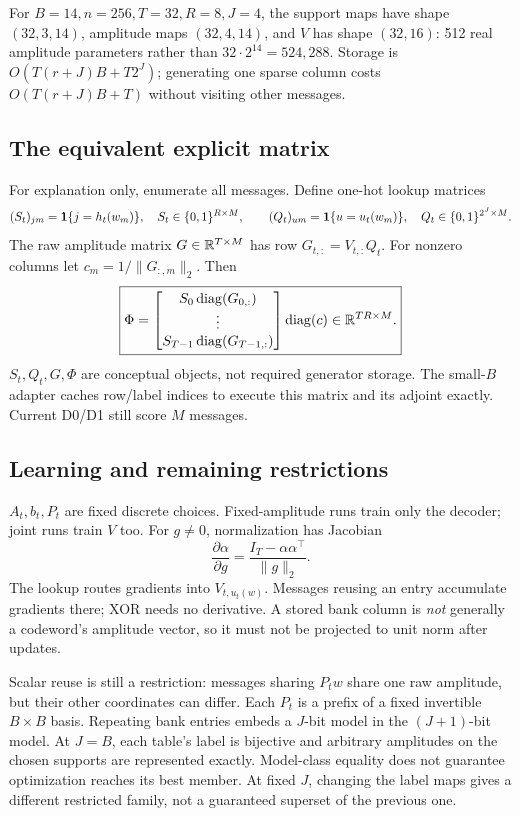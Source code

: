 \documentclass[11pt]{article}
\begin{document}
For $B=14,n=256,T=32,R=8,J=4$, the support maps have shape $(32,3,14)$, amplitude maps $(32,4,14)$,
and $V$ has shape $(32,16)$: 512 real amplitude parameters rather than $32\cdot2^{14}=524{,}288$.
Storage is $O(T(r+J)B+T2^J)$; generating one sparse column costs $O(T(r+J)B+T)$ without visiting other messages.

\subsection{The equivalent explicit matrix}

For explanation only, enumerate all messages. Define one-hot lookup matrices
\[
 (S_t)_{jm}=\mathbf{1}\{j=h_t(w_m)\},\quad S_t\in\{0,1\}^{R\times M},\qquad
 (Q_t)_{um}=\mathbf{1}\{u=u_t(w_m)\},\quad Q_t\in\{0,1\}^{2^J\times M}.
\]
The raw amplitude matrix $G\in\mathbb{R}^{T\times M}$ has row $G_{t,:}=V_{t,:}Q_t$.
For nonzero columns let $c_m=1/\|G_{:,m}\|_2$. Then
\[
 \boxed{\Phi=
 \begin{bmatrix}S_0\operatorname{diag}(G_{0,:})\\ \vdots\\ S_{T-1}\operatorname{diag}(G_{T-1,:})\end{bmatrix}
 \operatorname{diag}(c)\in\mathbb{R}^{TR\times M}.}
\]
$S_t,Q_t,G,\Phi$ are conceptual objects, not required generator storage. The small-$B$ adapter caches row/label
indices to execute this matrix and its adjoint exactly. Current D0/D1 still score $M$ messages.

\subsection{Learning and remaining restrictions}

$A_t,b_t,P_t$ are fixed discrete choices. Fixed-amplitude runs train only the decoder; joint runs train $V$ too.
For $g\ne0$, normalization has Jacobian
\[
 \frac{\partial\alpha}{\partial g}=\frac{I_T-\alpha\alpha^\top}{\|g\|_2}.
\]
The lookup routes gradients into $V_{t,u_t(w)}$. Messages reusing an entry accumulate gradients there; XOR needs
no derivative. A stored bank column is \emph{not} generally a codeword's amplitude vector, so it must not be
projected to unit norm after updates.

Scalar reuse is still a restriction: messages sharing $P_tw$ share one raw amplitude, but their other coordinates
can differ. Each $P_t$ is a prefix of a fixed invertible $B\times B$ basis. Repeating bank entries embeds a $J$-bit
model in the $(J+1)$-bit model. At $J=B$, each table's label is bijective and arbitrary amplitudes on the chosen
supports are represented exactly. Model-class equality does not guarantee optimization reaches its best member.
At fixed $J$, changing the label maps gives a different restricted family, not a guaranteed superset of the previous one.
\end{document}

